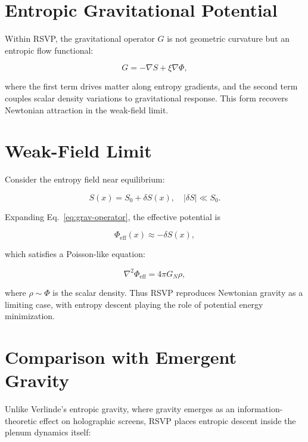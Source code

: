 \documentclass[12pt]{report}
\begin{document}
\section{Entropic Gravitational Potential}

Within RSVP, the gravitational operator $G$ is not geometric curvature but an entropic flow functional:

\begin{equation}
G = -\nabla S + \xi \nabla \Phi,
\label{eq:grav-operator}
\end{equation}

where the first term drives matter along entropy gradients, and the second term couples scalar density variations to gravitational response. This form recovers Newtonian attraction in the weak-field limit.

\section{Weak-Field Limit}

Consider the entropy field near equilibrium:

\begin{equation}
S(x) = S_0 + \delta S(x), \quad |\delta S| \ll S_0.
\end{equation}

Expanding Eq.~\eqref{eq:grav-operator}, the effective potential is

\begin{equation}
\Phi_{\text{eff}}(x) \approx - \delta S(x),
\end{equation}

which satisfies a Poisson-like equation:

\begin{equation}
\nabla^2 \Phi_{\text{eff}} = 4 \pi G_N \rho,
\end{equation}

where $\rho \sim \Phi$ is the scalar density. Thus RSVP reproduces Newtonian gravity as a limiting case, with entropy descent playing the role of potential energy minimization.

\section{Comparison with Emergent Gravity}

Unlike Verlinde’s entropic gravity, where gravity emerges as an information-theoretic effect on holographic screens, RSVP places entropic descent inside the plenum dynamics itself:
\end{document}
